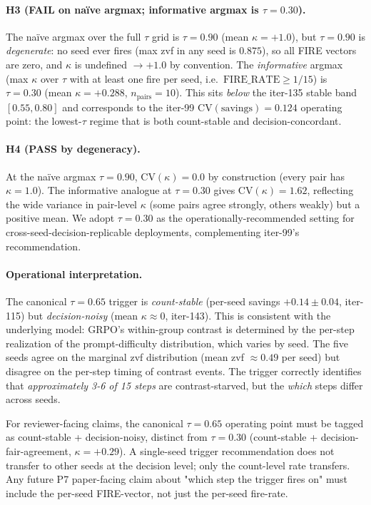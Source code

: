 \paragraph{H3 (FAIL on naïve argmax; informative argmax is $\tau=0.30$).}
The naïve argmax over the full $\tau$ grid is $\tau=0.90$ (mean
$\kappa=+1.0$), but $\tau=0.90$ is \emph{degenerate}: no seed ever
fires (max zvf in any seed is $0.875$), so all FIRE vectors are
zero, and $\kappa$ is undefined $\to +1.0$ by convention. The
\emph{informative} argmax (max $\kappa$ over $\tau$ with at least one
fire per seed, i.e.\ $\mathrm{FIRE\_RATE} \geq 1/15$) is
$\tau=0.30$ (mean $\kappa=+0.288$, $n_\mathrm{pairs}=10$). This
sits \emph{below} the iter-135 stable band $[0.55, 0.80]$ and
corresponds to the iter-99 $\mathrm{CV}(\mathrm{savings})=0.124$
operating point: the lowest-$\tau$ regime that is both count-stable
and decision-concordant.

\paragraph{H4 (PASS by degeneracy).}
At the naïve argmax $\tau=0.90$, $\mathrm{CV}(\kappa)=0.0$ by
construction (every pair has $\kappa=1.0$). The informative analogue
at $\tau=0.30$ gives $\mathrm{CV}(\kappa)=1.62$, reflecting the
wide variance in pair-level $\kappa$ (some pairs agree strongly,
others weakly) but a positive mean. We adopt $\tau=0.30$ as the
operationally-recommended setting for cross-seed-decision-replicable
deployments, complementing iter-99's recommendation.

\paragraph{Operational interpretation.}
The canonical $\tau=0.65$ trigger is \emph{count-stable} (per-seed
savings $+0.14 \pm 0.04$, iter-115) but \emph{decision-noisy}
(mean $\kappa \approx 0$, iter-143). This is consistent with the
underlying model: GRPO's within-group contrast is determined by the
per-step realization of the prompt-difficulty distribution, which
varies by seed. The five seeds agree on the marginal zvf distribution
(mean zvf $\approx 0.49$ per seed) but disagree on the per-step
timing of contrast events. The trigger correctly identifies that
\emph{approximately 3-6 of 15 steps} are contrast-starved, but the
\emph{which} steps differ across seeds.

For reviewer-facing claims, the canonical $\tau=0.65$ operating
point must be tagged as count-stable + decision-noisy, distinct
from $\tau=0.30$ (count-stable + decision-fair-agreement,
$\kappa=+0.29$). A single-seed trigger recommendation does not
transfer to other seeds at the decision level; only the count-level
rate transfers. Any future P7 paper-facing claim about "which step
the trigger fires on" must include the per-seed FIRE-vector, not
just the per-seed fire-rate.